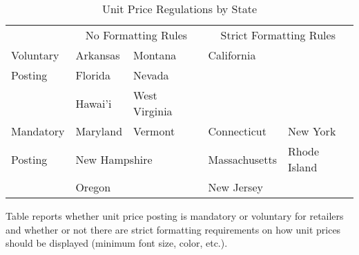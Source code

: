 \begin{table}[!htbp] \centering
\caption{Unit Price Regulations by State}
\label{tab:unitPriceLawTable}
\begin{tabularx}{\textwidth}{l|XX|XX|}

    \multicolumn{1}{l}{}  & \multicolumn{2}{c}{No Formatting Rules} & \multicolumn{2}{c}{Strict Formatting Rules} \\
    \cline{2-5}
  Voluntary & Arkansas & Montana & California & \\
  Posting   & Florida   & Nevada &            & \\
            & Hawai'i & West Virginia &       & \\
               \cline{2-5}
 Mandatory & Maryland & Vermont & Connecticut & New York \\
 Posting    & \multicolumn{2}{l|}{New Hampshire}    & Massachusetts & Rhode Island \\
            & Oregon        &   & New Jersey    &       \\
                            \cline{2-5}
\end{tabularx}
\begin{tablenotes}
Table reports whether unit price posting is mandatory or voluntary for retailers and whether or not there are strict formatting requirements on how unit prices should be displayed (minimum font size, color, etc.).
\end{tablenotes}
\end{table}
